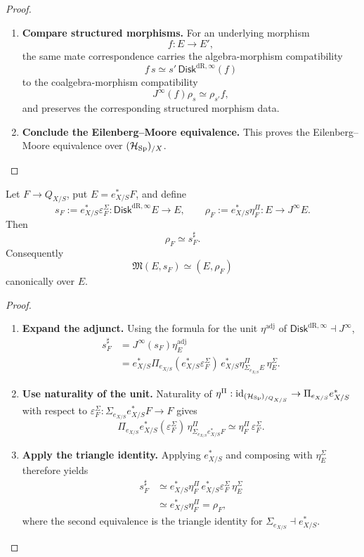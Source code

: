 \begin{proof}
\begin{enumerate}[label=\textup{(\arabic*)}]
    \item \textbf{Compare structured morphisms.}
For an underlying morphism
\[
  f:E\to E',
\]
the same mate correspondence carries the algebra-morphism
compatibility
\[
  f\,s\simeq s'\,\mathsf{Disk}^{\mathrm{dR},\infty}(f)
\]
to the coalgebra-morphism compatibility
\[
  J^\infty(f)\rho_s\simeq\rho_{s'}f,
\]
and preserves the corresponding structured morphism data.

    \item \textbf{Conclude the Eilenberg--Moore equivalence.}
This proves the Eilenberg--Moore equivalence over
\((\mathcal H_{\operatorname{Sp}})_{/X}\).
\end{enumerate}
\end{proof}

\begin{corollary}
\label{cor:comparison-actions-coactions-mates}
Let \(F\to Q_{X/S}\), put \(E=e_{X/S}^*F\), and define
\[
  s_F:=e_{X/S}^*\varepsilon^\Sigma_F:\mathsf{Disk}^{\mathrm{dR},\infty} E\to E,
  \qquad
  \rho_F:=e_{X/S}^*\eta^\Pi_F:E\to J^\infty E.
\]
Then
\[
  \rho_F\simeq s_F^\sharp.
\]
Consequently
\[
  \mathfrak M(E,s_F)\simeq(E,\rho_F)
\]
canonically over \(E\).
\end{corollary}

\begin{proof}
\leavevmode
\begin{enumerate}[label=\textup{(\arabic*)}]
    \item \textbf{Expand the adjunct.}
Using the formula for the unit \(\eta^{\mathrm{adj}}\) of
\(\mathsf{Disk}^{\mathrm{dR},\infty}\dashv J^\infty\),
\[
\begin{aligned}
  s_F^\sharp
  &=
  J^\infty(s_F)\eta^{\mathrm{adj}}_E\\
  &=
  e_{X/S}^*\Pi_{e_{X/S}}(e_{X/S}^*\varepsilon^\Sigma_F)\,
  e_{X/S}^*\eta^\Pi_{\Sigma_{e_{X/S}} E}\,
  \eta^\Sigma_E.
\end{aligned}
\]

    \item \textbf{Use naturality of the unit.}
Naturality of
\(\eta^\Pi:\operatorname{id}_{(\mathcal H_{\operatorname{Sp}})_{/Q_{X/S}}}\to\Pi_{e_{X/S}}e_{X/S}^*\)
with respect to
\(\varepsilon^\Sigma_F:\Sigma_{e_{X/S}}e_{X/S}^*F\to F\) gives
\[
  \Pi_{e_{X/S}}e_{X/S}^*(\varepsilon^\Sigma_F)\,\eta^\Pi_{\Sigma_{e_{X/S}}e_{X/S}^*F}
  \simeq
  \eta^\Pi_F\,\varepsilon^\Sigma_F.
\]

    \item \textbf{Apply the triangle identity.}
Applying \(e_{X/S}^*\) and composing with \(\eta^\Sigma_E\) therefore yields
\[
\begin{aligned}
  s_F^\sharp
  &\simeq
  e_{X/S}^*\eta^\Pi_F\,
  e_{X/S}^*\varepsilon^\Sigma_F\,
  \eta^\Sigma_E\\
  &\simeq
  e_{X/S}^*\eta^\Pi_F
  =
  \rho_F,
\end{aligned}
\]
where the second equivalence is the triangle identity for
\(\Sigma_{e_{X/S}}\dashv e_{X/S}^*\).
\end{enumerate}
\end{proof}


